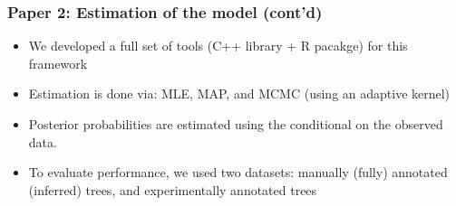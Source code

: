\documentclass[aspectratio=169, 10pt]{beamer}\usepackage[]{graphicx}\usepackage[]{color}
\begin{document}
\begin{frame}[label=aphylo]
\frametitle{Paper 2: Estimation of the model (cont'd)}
\begin{itemize}
\item We developed a full set of tools (C++ library + R pacakge) for this framework
\hyperlink{aphylopkg}{}
\item Estimation is done via: MLE, MAP, and MCMC (using an adaptive kernel)
\item Posterior probabilities are estimated using the conditional on the observed data.
\item To evaluate performance, we used two datasets: manually (fully) annotated (inferred) trees, and experimentally annotated trees
\end{itemize}
\end{frame}
\end{document}
